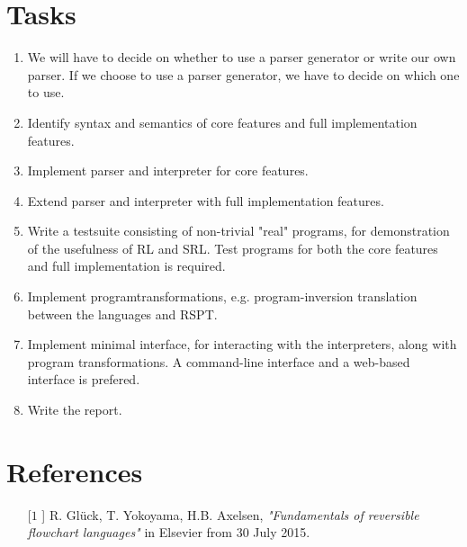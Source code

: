 \section{Tasks}
\label{sec:tasks}

\begin{enumerate}

  \item We will have to decide on whether to use a parser generator or write our own parser. If we choose to use a parser generator, we have to decide on which one to use.

  \item Identify syntax and semantics of core features and full implementation features.

  \item Implement parser and interpreter for core features.

  \item Extend parser and interpreter with full implementation features.

  \item Write a testsuite consisting of non-trivial "real" programs, for demonstration of the usefulness of RL and SRL. Test programs for both the core features and full implementation is required.

  \item Implement programtransformations, e.g. program-inversion translation between the languages and RSPT.

  \item Implement minimal interface, for interacting with the interpreters, along with program transformations. A command-line interface and a web-based interface is prefered.

  \item Write the report.

\end{enumerate}


\appendix
\section{References}

\begin{enumerate}
  \item[[$1$]] R. Glück, T. Yokoyama, H.B. Axelsen, \textit{"Fundamentals of reversible flowchart languages"} in Elsevier from 30 July 2015.
\end{enumerate}
